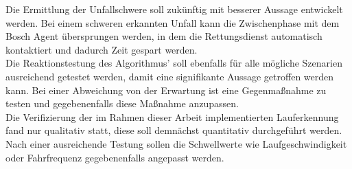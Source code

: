 Die Ermittlung der Unfallschwere soll zukünftig mit besserer Aussage entwickelt werden. Bei einem schweren erkannten Unfall kann die Zwischenphase mit dem Bosch Agent übersprungen werden, in dem die Rettungsdienst automatisch kontaktiert und dadurch Zeit gespart werden.\\

Die Reaktionstestung des Algorithmus' soll ebenfalls für alle mögliche Szenarien ausreichend getestet werden, damit eine signifikante Aussage getroffen werden kann. Bei einer Abweichung von der Erwartung ist eine Gegenmaßnahme zu testen und gegebenenfalls diese Maßnahme anzupassen.\\

Die Verifizierung der im Rahmen dieser Arbeit implementierten Lauferkennung fand nur qualitativ statt, diese soll demnächst quantitativ durchgeführt werden. Nach einer ausreichende Testung sollen die Schwellwerte wie Laufgeschwindigkeit oder Fahrfrequenz gegebenenfalls angepasst werden.\\

%
%
%
